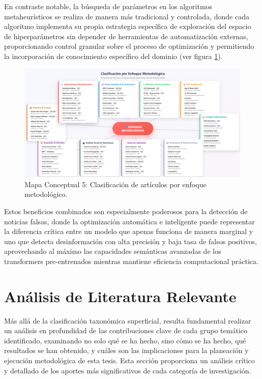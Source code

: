 En contraste notable, la búsqueda de parámetros en los algoritmos metaheurísticos se realiza de manera más tradicional y controlada, donde cada algoritmo implementa su propia estrategia específica de exploración del espacio de hiperparámetros sin depender de herramientas de automatización externas, proporcionando control granular sobre el proceso de optimización y permitiendo la incorporación de conocimiento específico del dominio (ver figura \ref{fig:mapa_conceptual_5}).

\begin{figure}[h!]
    \centering
    \includegraphics[width=\textwidth]{Imagenes/mapaConceptual5.png}
    \caption{Mapa Conceptual 5: Clasificación de artículos por enfoque metodológico.}
    \label{fig:mapa_conceptual_5}
\end{figure}

Estos beneficios combinados son especialmente poderosos para la detección de noticias falsas, donde la optimización automática e inteligente puede representar la diferencia crítica entre un modelo que apenas funciona de manera marginal y uno que detecta desinformación con alta precisión y baja tasa de falsos positivos, aprovechando al máximo las capacidades semánticas avanzadas de los transformers pre-entrenados mientras mantiene eficiencia computacional práctica.

\section{Análisis de Literatura Relevante}
\label{sec:analisis_tematico}

Más allá de la clasificación taxonómica superficial, resulta fundamental realizar un análisis en profundidad de las contribuciones clave de cada grupo temático identificado, examinando no solo qué se ha hecho, sino cómo se ha hecho, qué resultados se han obtenido, y cuáles son las implicaciones para la planeación y ejecución metodológica de esta tesis. Esta sección proporciona un análisis crítico y detallado de los aportes más significativos de cada categoría de investigación.

